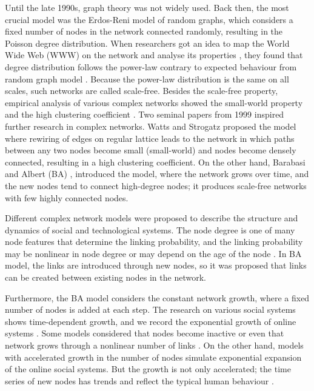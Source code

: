 Until the late 1990s, graph theory was not widely used. Back then, the most crucial model was the Erdos-Reni model of random graphs, which considers a fixed number of nodes in the network connected randomly, resulting in the Poisson degree distribution. When researchers got an idea to map the World Wide Web (WWW) on the network and analyse its properties \cite{huberman1999}, they found that degree distribution follows the power-law contrary to expected behaviour from random graph model \cite{dorogovtsev2010complex}. Because the power-law distribution is the same on all scales, such networks are called scale-free. Besides the scale-free property, empirical analysis of various complex networks showed the small-world property and the high clustering coefficient \cite{barabasi2009,newman2010}. Two seminal papers from 1999 inspired further research in complex networks. Watts and Strogatz \cite{watts1998collective} proposed the model where rewiring of edges on regular lattice leads to the network in which paths between any two nodes become small (small-world) and nodes become densely connected, resulting in a high clustering coefficient. On the other hand, Barabasi and Albert (BA) \cite{barabasi1999}, introduced the model, where the network grows over time, and the new nodes tend to connect high-degree nodes; it produces scale-free networks with few highly connected nodes. 

Different complex network models were proposed to describe the structure and dynamics of social and technological systems. The node degree is one of many node features that determine the linking probability, and the linking probability may be nonlinear in node degree or may depend on the age of the node \cite{dorogovtsev2000b, dorogovtsev2001b}. In BA model, the links are introduced through new nodes, so it was proposed that links can be created between existing nodes in the network.  

Furthermore, the BA model considers the constant network growth, where a fixed number of nodes is added at each step. The research on various social systems shows time-dependent growth, and we record the exponential growth of online systems \cite{liu2019}. Some models considered that nodes become inactive or even that network grows through a nonlinear number of links \cite{pham2016}. On the other hand, models with accelerated growth in the number of nodes \cite{sen2004} simulate exponential expansion of the online social systems. But the growth is not only accelerated; the time series of new nodes has trends and reflect the typical human behaviour \cite{mitrovic2010a, mitrovic2012,mitrovic2015}.

